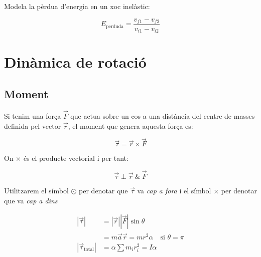 Modela la pèrdua d'energia en un xoc inelàstic:

\begin{equation}
    E_\text{perduda} = \frac{v_{f1}-v_{f2}}{v_{i1}-v_{i2}}
\end{equation}

\section{Dinàmica de rotació}
\label{sec:dinamica_de_rotacio}

\subsection{Moment}
\label{sub:moment}

Si tenim una força $\vec{F}$ que actua sobre un cos a una distància del centre de masses definida pel vector $\vec{r}$, el moment que genera aquesta força es:

\begin{equation}
    \vec{\tau} = \vec{r} \times \vec{F}
\end{equation}

On $\times$ és el producte vectorial i per tant:

\begin{equation}
    \vec{\tau} \perp \vec{r}\ \&\ \vec{F}
\end{equation}

\begin{center}
\end{center}

Utilitzarem el símbol $\odot$ per denotar que $\vec{\tau}$ va \emph{cap a fora} i el símbol $\times$ per denotar que va \emph{cap a dins}

\begin{align}
    |\vec{\tau}| &= |\vec{r}||\vec{F}|\sin \theta \\
    &= m\vec{a}\vec{r} = m r^2 \alpha \quad \text{si $\theta = \pi$}\\
    |\vec{\tau}_\text{total}| &= \alpha \sum m_i r_i^2 = I\alpha
\end{align}

